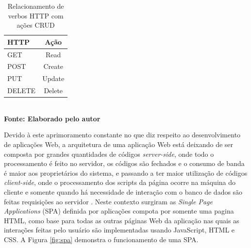 \begin{table}[htb]
	\centering
	\caption{\hspace{0.1cm} Relacionamento de verbos HTTP com ações CRUD}
	\vspace{-0.3cm} %
	\label{tab:tabela1}
	\begin{tabular}{l|c}
  \hline
    \textbf{HTTP} & \textbf{Ação} \\
    \hline
      GET & Read \\
      POST & Create \\
      PUT & Update \\
      DELETE & Delete \\
     \hline
 \end{tabular}
 	\vspace{.1cm}  %
	\small
	{\footnotesize\\ \textbf{Fonte: Elaborado pelo autor}}
\end{table}

Devido à este aprimoramento constante no que diz respeito ao desenvolvimento de aplicações Web, a arquitetura de uma aplicação Web está deixando 
de ser composta por grandes quantidades de códigos \textit{server-side}, onde todo o processamento é feito no servidor, os códigos são fechados e 
o consumo de banda é maior aos proprietários do sistema, e passando a ter maior utilização de códigos \textit{client-side}, onde o processamento dos 
scripts da página ocorre na máquina do cliente e somente quando há necessidade de interação com o banco de dados são feitas requisições ao servidor 
\cite{spa01}. Neste contexto surgiram as \textit{Single Page Applications} (SPA) definida por \cite{spa02} aplicações compota por somente uma 
pagina HTML, como base para todas as outras páginas Web da aplicação nas quais as interações feitas pelo usuário são implementadas usando JavaScript,
HTML e CSS. A Figura \ref{fig:spa} demonstra o funcionamento de uma SPA.

